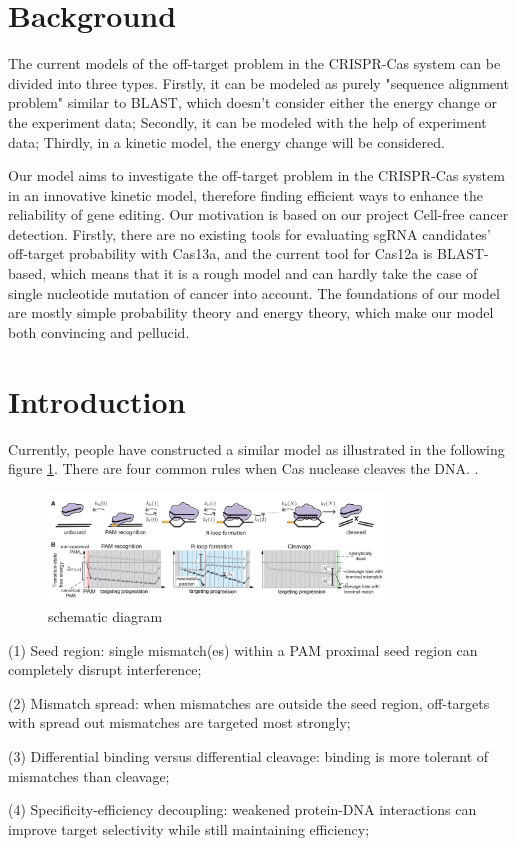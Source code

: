 \section{Background}
The current models of the off-target problem in the CRISPR-Cas system can be divided into three types. Firstly, it can be modeled as purely "sequence alignment problem" similar to BLAST, which doesn't consider either the energy change or the experiment data; Secondly, it can be modeled with the help of experiment data; Thirdly, in a kinetic model, the energy change will be considered. 

Our model aims to investigate the off-target problem in the CRISPR-Cas system in an innovative kinetic model, therefore finding efficient ways to enhance the reliability of gene editing. Our motivation is based on our project Cell-free cancer detection. Firstly, there are no existing tools for evaluating sgRNA candidates' off-target probability with Cas13a, and the current tool for Cas12a is BLAST-based, which means that it is a rough model and can hardly take the case of single nucleotide mutation of cancer into account. The foundations of our model are mostly simple probability theory and energy theory, which make our model both convincing and pellucid.

\section{Introduction}
Currently, people have constructed a similar model as illustrated in the following figure \ref{fig:1}. There are four common rules when Cas nuclease cleaves the DNA\cite{klein2018hybridization}.
	.
\begin{figure}[tbph]
\centering
\includegraphics[width=3.5in]{1}
\caption{schematic diagram}
\label{fig:1}
\end{figure}
	
(1) Seed region: single mismatch(es) within a PAM proximal seed region can completely disrupt interference;\par
(2) Mismatch spread: when mismatches are outside the seed region, off-targets with spread out mismatches are targeted most strongly;\par
(3) Differential binding versus differential cleavage: binding is more tolerant of mismatches than cleavage;\par 
(4) Specificity-efficiency decoupling: weakened protein-DNA interactions can improve target selectivity while still maintaining efficiency;\par

